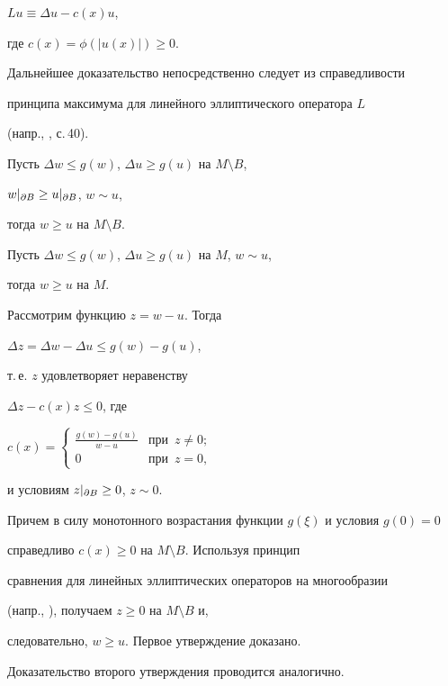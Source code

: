 $Lu\equiv\Delta u-c(x)u$,


где $c(x)=\phi(|u(x)|)\geq 0$.


Дальнейшее доказательство непосредственно следует из справедливости


принципа максимума для линейного эллиптического оператора $L$


(напр., \cite{Gi-T}, с.\,40).








\begin{props}


Пусть $\Delta w\leq g(w)$, $\Delta u\geq g(u)$ на $M\setminus B$, 


$w|_{\partial{B}}\geq u|_{\partial{B}}$, $w\sim u$,


тогда $w\geq u$ на $M\setminus B$.





Пусть $\Delta w\leq g(w)$, $\Delta u\geq g(u)$ на $M$, $w\sim u$, 


тогда $w\geq u$ на $M$. 


\end{props}








\begin{pf}


Рассмотрим функцию $z=w-u$. Тогда 


$\Delta z=\Delta w-\Delta u\leq g(w)-g(u)$, 


т.\,е. $z$ удовлетворяет неравенству 


$\Delta z-c(x)z\leq0$, где 


$c(x)=\begin{cases}


\frac{g(w)-g(u)}{w-u}& \text{при}\ \; z\ne0;\\


0& \text{при}\ \; z=0,


\end{cases}


$


и условиям $z|_{\partial{B}}\geq0$, $z\sim0$.


Причем в силу монотонного возрастания функции $g(\xi)$ и условия $g(0)=0$ 


справедливо $c(x)\geq0$ на $M\setminus B$. Используя принцип


сравнения для линейных эллиптических операторов на многообразии


(напр., \cite{Maz}), получаем $z\geq 0$ на $M\setminus B$ и,


следовательно, $w\geq u$. Первое утверждение доказано.





Доказательство второго утверждения проводится аналогично.


\end{pf}





